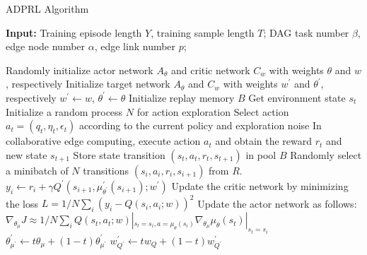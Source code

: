 \documentclass[10pt, conference, letterpaper]{IEEEtran}
\begin{document}



\begin{algorithm}[t]
	\caption{ADPRL Algorithm}
	\label{alg_ddpg}
	\textbf{Input:} Training episode length $Y$, training sample length $T$; DAG task number $\beta$, edge node number $\alpha$, edge link number $p$;
	\begin{algorithmic}[1]
	    \State Randomly initialize actor network $A_\theta$ and critic network $C_w$ with weights $\theta$ and $w$, respectively
        \State Initialize target network $A_\theta$ and $C_w$ with weights $w^{\prime}$ and $\theta^{\prime}$, respectively
        \State $w^{\prime} \gets w$, $\theta^{\prime} \gets \theta$
	    \State Initialize replay memory $B$
	        \State Get environment state $s_t$
	        \State Initialize a random process $N$ for action exploration
    	      \State Select action $a_t = ( q_t, \eta_t, \epsilon_t )$ according to the current policy and exploration noise
    	      \State In collaborative edge computing, execute action $a_t$ and obtain the reward $r_t$ and new state $s_{t+1}$
              \State Store state transition $(s_t, a_t, r_t, s_{t+1})$ in pool $B$
              \State Randomly select a minibatch of $N$ transitions $(s_i, a_i, r_i, s_{i+1})$ from $R$.
              \State $y_i \gets r_i + \gamma Q^{\prime} (s_{i+1}, \mu^{\prime}_{\theta^{\prime}} (s_{i+1}); w^{\prime})$
              \State Update the critic network by minimizing the loss $L = 1/N \sum_i (y_i-Q(s_i, a_i;w))^2$
              \State Update the actor network as follows: $\nabla_{\theta_\mu} J \approx 1/N \sum_i Q(s_t, a_t;w)|_{s_l=s_i,a=\mu_\theta (s_i)} \nabla_{\theta_\mu} \mu_\theta (s_t) |_{s_t = s_i}$
              \State $\theta^{\prime}_{\mu^{\prime}} \gets t \theta_\mu + (1-t) \theta^{\prime}_{\mu^{\prime}}$
              \State $w^{\prime}_{Q^{\prime}} \gets t w_Q+(1- t) w^{\prime}_{Q^{\prime}}$
            \EndFor
        \EndFor
	\end{algorithmic} 
\end{algorithm}
\end{document}
